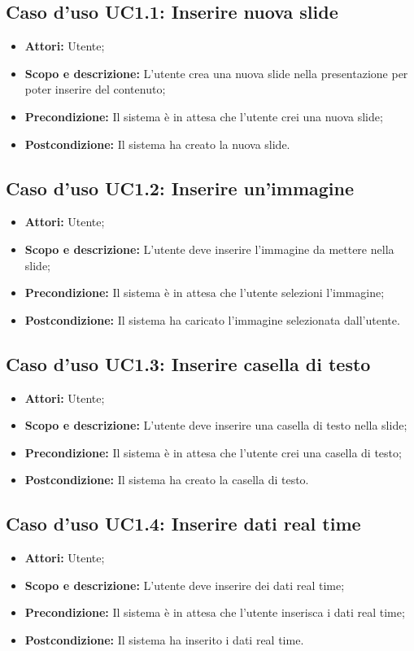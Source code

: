 \subsection{Caso d'uso UC1.1: Inserire nuova slide}
\begin{itemize}
	\item \textbf{Attori:} Utente;
	\item \textbf{Scopo e descrizione:} L'utente crea una nuova slide nella presentazione per poter inserire del contenuto;
	\item \textbf{Precondizione:} Il sistema è in attesa che l'utente crei una nuova slide;
	\item \textbf{Postcondizione:} Il sistema ha creato la nuova slide.
\end{itemize}

\subsection{Caso d'uso UC1.2: Inserire un'immagine}
\begin{itemize}
\item \textbf{Attori:} Utente;
\item \textbf{Scopo e descrizione:} L'utente deve inserire l'immagine da mettere nella slide;
\item \textbf{Precondizione:} Il sistema è in attesa che l'utente selezioni l'immagine;
\item \textbf{Postcondizione:} Il sistema ha caricato l'immagine selezionata dall'utente.
\end{itemize}

\subsection{Caso d'uso UC1.3: Inserire casella di testo}
\begin{itemize}
\item \textbf{Attori:} Utente;
\item \textbf{Scopo e descrizione:} L'utente deve inserire una casella di testo nella slide;
\item \textbf{Precondizione:} Il sistema è in attesa che l'utente crei una casella di testo;
\item \textbf{Postcondizione:} Il sistema ha creato la casella di testo.
\end{itemize}

\subsection{Caso d'uso UC1.4: Inserire dati real time}
\begin{itemize}
	\item \textbf{Attori:} Utente;
	\item \textbf{Scopo e descrizione:} L'utente deve inserire dei dati \gls{real time};
	\item \textbf{Precondizione:} Il sistema è in attesa che l'utente inserisca i dati \gls{real time};
	\item \textbf{Postcondizione:} Il sistema ha inserito i dati \gls{real time}.
\end{itemize}

